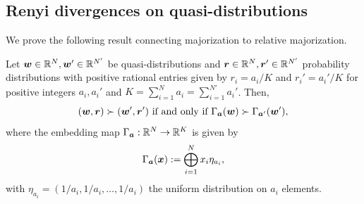 \documentclass[pra,
aps,
twocolumn,
superscriptaddress,
groupedaddress,
nofootinbib,
reprint
]{revtex4-1}
\begin{document}
\subsection{Renyi divergences on quasi-distributions}
We prove the following result connecting majorization to relative majorization.
\begin{lemma}
Let $\boldsymbol{w}\in \mathbb{R}^N, \boldsymbol{w}'\in \mathbb{R}^{N'}$ be quasi-distributions and $\boldsymbol{r}\in \mathbb{R}^N, \boldsymbol{r}'\in \mathbb{R}^{N'}$ probability distributions with positive rational entries given by $r_i = a_i/K$ and $r_i' = a_i'/K$ for positive integers $a_i, a_i'$ and $K = \sum_{i=1}^N a_i = \sum_{i=1}^{N'} a_i'$. 
Then,
\begin{equation}
(\boldsymbol{w}, \boldsymbol{r}) \succ (\boldsymbol{w}', \boldsymbol{r}') \mbox{ if and only if } \Gamma_{\bm{a}} (\boldsymbol{w}) \succ \Gamma_{\bm{a}'} (\boldsymbol{w}'),
\end{equation}
where the embedding map $\Gamma_{\bm{a}} :\mathbb{R}^N \rightarrow \mathbb{R}^K$ is given by
\begin{equation}
	\Gamma_{\bm{a}}(\boldsymbol{x}) := \bigoplus_{i=1}^N x_i \eta_{a_i},
\end{equation}
with $\eta_{a_i} = (1/a_i, 1/a_i, \dots, 1/a_i)$ the uniform distribution on $a_i$ elements.
\end{lemma}
\end{document}
